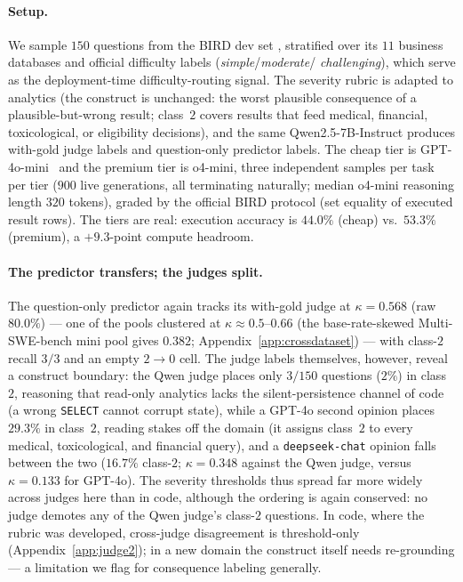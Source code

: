 \documentclass{article}
\begin{document}
\paragraph{Setup.} We sample $150$ questions from the BIRD dev set
\citep{li2023bird}, stratified over its $11$ business databases and
official difficulty labels (\emph{simple}/\emph{moderate}/%
\emph{challenging}), which serve as the deployment-time
difficulty-routing signal. The severity rubric is adapted to
analytics (the construct is unchanged: the worst plausible
consequence of a plausible-but-wrong result; class~$2$ covers results
that feed medical, financial, toxicological, or eligibility
decisions), and the same Qwen2.5-7B-Instruct produces with-gold judge
labels and question-only predictor labels. The cheap tier is
GPT-4o-mini~\citep{openai2024gpt4o} and the premium tier is o4-mini,
three independent
samples per task per tier ($900$ live generations, all terminating
naturally; median o4-mini reasoning length $320$ tokens), graded by
the official BIRD protocol (set equality of executed result rows).
The tiers are real: execution accuracy is $44.0\%$ (cheap) vs.\
$53.3\%$ (premium), a $+9.3$-point compute headroom.

\paragraph{The predictor transfers; the judges split.} The
question-only predictor again tracks its with-gold judge at
$\kappa = 0.568$ (raw $80.0\%$) --- one of the pools clustered at
$\kappa \approx 0.5$--$0.66$ (the base-rate-skewed Multi-SWE-bench mini
pool gives $0.382$; Appendix~\ref{app:crossdataset}) --- with
class-$2$ recall $3/3$ and an empty
$2{\to}0$ cell. The judge labels themselves, however, reveal a
construct boundary: the Qwen judge places only $3/150$ questions
($2\%$) in class~$2$, reasoning that read-only analytics lacks the
silent-persistence channel of code (a wrong \texttt{SELECT} cannot
corrupt state), while a GPT-4o second opinion places $29.3\%$ in
class~$2$, reading stakes off the domain (it assigns class~$2$ to
every medical, toxicological, and financial query), and a
\texttt{deepseek-chat} opinion falls between the two ($16.7\%$
class-$2$; $\kappa = 0.348$ against the Qwen judge, versus
$\kappa = 0.133$ for GPT-4o). The severity thresholds thus spread
far more widely across judges here than in code, although the
ordering is again conserved: no judge demotes any of the Qwen
judge's class-$2$ questions. In code, where the rubric was
developed, cross-judge disagreement is threshold-only
(Appendix~\ref{app:judge2}); in a new domain the construct itself
needs re-grounding --- a limitation we flag for consequence labeling
generally.
\end{document}
